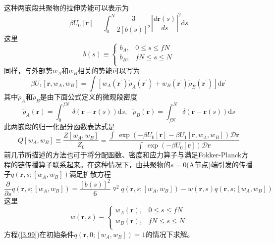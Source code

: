 这种两嵌段共聚物的拉伸势能可以表示为
\begin{equation}
\beta U_0[\mathbf{r}]=\int_{0}^{N} \frac{3}{2[b(s)]^2}\left| \frac{d\mathbf{r}(s)}{ds} \right|^2 \mathrm{d}s
\end{equation}
这里
\begin{equation}
b(s)\equiv
\begin{cases}
b_A, & 0\leq s \leq fN \\
b_B, & fN \leq s \leq N\\
\end{cases}
\end{equation}
同样，与外部势$w_A$和$w_B$相关的势能可以写为
\begin{equation}
\beta U_1[\mathbf{r},w_A,w_B]=\int [w_A(\mathbf{r}^{'})\tilde{\rho}_{A}(\mathbf{r}^{'})+w_B(\mathbf{r}^{'})\tilde{\rho}_{B}(\mathbf{r}^{'})] \mathrm{d}\mathbf{r}^{'}
\end{equation}
其中$\tilde{\rho} _A$和$\tilde{\rho} _B$是由下面公式定义的微观段密度
\begin{equation}
\tilde{\rho} _A(\mathbf{r})=\int _0^{fN} ~\delta(\mathbf{r}-\mathbf{r}(s)) \mathrm{d}s,~~~\tilde{\rho} _B(\mathbf{r})=\int _{fN}^{N} ~\delta(\mathbf{r}-\mathbf{r}(s)) \mathrm{d}s
\end{equation}
此两嵌段的归一化配分函数表达式是
\begin{equation}
Q[w_A,w_B]\equiv\frac{Z[w_A,w_B]}{Z_0}=\frac{\int ~\exp(-\beta U_0[\mathbf{r}]-\beta U_1[\mathbf{r},w_A,w_B]) \mathcal{D}\mathbf{r}}{\int ~\exp(-\beta U_0[\mathbf{r}]) \mathcal{D}\mathbf{r}}
\end{equation}
前几节所描述的方法也可于将分配函数、密度和应力算子与满足Fokker-Planck方程的链传播算子联系起来。在这种情况下，由共聚物的$s=0$(A节点)端引发的传播子$q(\mathbf{r},s;[w_A,w_B])$满足扩散方程
\begin{equation}
\frac{\partial}{\partial s}q(\mathbf{r},s;[w_A,w_B])=\frac{[b(s)]^2}{6}\triangledown ^2q(\mathbf{r},s;[w_A,w_B])-w(\mathbf{r},s)q(\mathbf{r},s;[w_A,w_B]) \label{3.99}
\end{equation}
这里
\begin{equation}
w(\mathbf{r},s)\equiv
\begin{cases}
w_A(\mathbf{r}), & 0\leq s \leq fN \\
w_B(\mathbf{r}), & fN \leq s \leq N\\
\end{cases}
\end{equation}
方程(\ref{3.99})在初始条件$q(\mathbf{r},0;[w_A,w_B])=1$的情况下求解。

